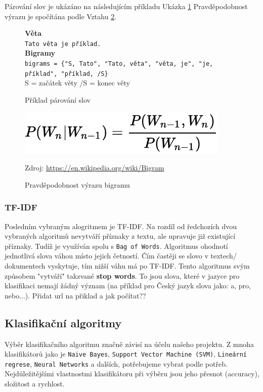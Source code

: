 \documentclass[12pt]{article}
\begin{document}
Párování slov je ukázáno na následujícím příkladu Ukázka \ref{fig:bigram_pairing}
Pravděpodobnost výrazu je spočítána podle Vztahu \ref{fig:bigram_prob}.
\begin{figure}[H]
	\textbf{Věta}\\
	\texttt{Tato věta je příklad.}\\

	\textbf{Bigramy}\\
	\texttt{bigrams = \{"S, Tato", "Tato, věta", "věta, je", "je, příklad", "příklad, /S\}}\\

	S = začátek věty
	/S = konec věty
        \caption{Příklad párování slov}
        \label{fig:bigram_pairing}
\end{figure}
\begin{figure}[H]
        \centering
        \includegraphics[]{img/bigram_prob.pdf}
        \caption{Pravděpodobnost výrazu bigramu}
        Zdroj: \url{https://en.wikipedia.org/wiki/Bigram}
        \label{fig:bigram_prob}
\end{figure}
\subsubsection{TF-IDF}
Posledním vybraným alogritmem je TF-IDF. Na rozdíl od ředchozích dvou
vybraných algoritmů nevytváří příznaky z textu, ale upravuje již 
existující příznaky. Tudíž je využíván spolu s \texttt{Bag of Words}.
Algoritmus ohodnotí jednotlivá slova váhou místo jejich četností.
Čím častěji se slovo v textech/ dokumentech vyskytuje, tím nižší váhu
má po TF-IDF. Tento algoritmus svým způsobem "vytváří" takzvané 
\textbf{stop words}. To jsou slova, které v jazyce pro klasifikaci
nemají žádný význam (na příklad pro Český jazyk slova jako: a, pro, 
nebo...).
Přidat url na přiklad a jak počítat??
%
\subsection{Klasifikační algoritmy}
Výběr klasifikačního algoritmu značně závisí na účelu našeho 
projektu. Z mnoha klasifikátorů jako je \texttt{Naive Bayes},
\texttt{Support Vector Machine (SVM)}, \texttt{Lineární regrese},
\texttt{Neural Networks} a dalších, potřebujeme vybrat podle potřeb.
Nejdůležitějšími vlastnostmi klasifikátoru při výběru jsou jeho 
přesnot (accuracy), složitost a rychlost.
\end{document}
